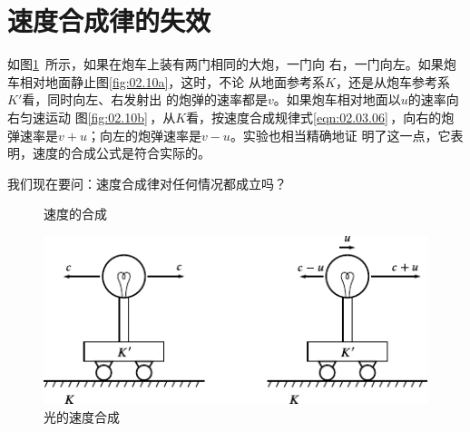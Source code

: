 \section{速度合成律的失效}\label{sec:02.06}

如图\ref{fig:02.10}~所示，如果在炮车上装有两门相同的大炮，一门向
右，一门向左。如果炮车相对地面静止\lbr 图\ref{fig:02.10a}\rbr，这时，不论
从地面参考系$K$，还是从炮车参考系$K'$看，同时向左、右发射出
的炮弹的速率都是$v$。如果炮车相对地面以$u$的速率向右匀速运动
\lbr 图\ref{fig:02.10b}\,\rbr ，从$K$看，按速度合成规律\lbr 式\eqref{eqn:02.03.06}\,\rbr ，向右的炮
弹速率是$v+u$；向左的炮弹速率是$v-u$。实验也相当精确地证
明了这一点，它表明，速度的合成公式是符合实际的。

我们现在要问：速度合成律对任何情况都成立吗？

\clearpage
\begin{figure}
  \centering
  \hspace{2em}
  \caption{速度的合成}
  \label{fig:02.10}
\end{figure}

\begin{figure}
  \centering
  \includegraphics{figure/fig02.11}
  \caption{光的速度合成}
  \label{fig:02.11}
\end{figure}

